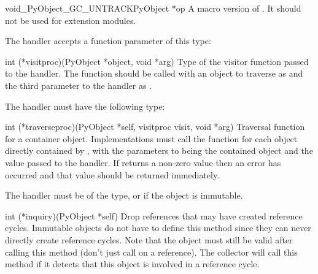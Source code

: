 \begin{cfuncdesc}{void}{_PyObject_GC_UNTRACK}{PyObject *op}
  A macro version of .  It should not be
  used for extension modules.
\end{cfuncdesc}

The  handler accepts a function parameter of this
type:

\begin{ctypedesc}[visitproc]{int (*visitproc)(PyObject *object, void *arg)}
  Type of the visitor function passed to the 
  handler.  The function should be called with an object to traverse
  as  and the third parameter to the 
  handler as .
\end{ctypedesc}

The  handler must have the following type:

\begin{ctypedesc}[traverseproc]{int (*traverseproc)(PyObject *self,
                                visitproc visit, void *arg)}
  Traversal function for a container object.  Implementations must
  call the  function for each object directly contained by
  , with the parameters to  being the contained
  object and the  value passed to the handler.  If
   returns a non-zero value then an error has occurred and
  that value should be returned immediately.
\end{ctypedesc}

The  handler must be of the  type, or
\NULL{} if the object is immutable.

\begin{ctypedesc}[inquiry]{int (*inquiry)(PyObject *self)}
  Drop references that may have created reference cycles.  Immutable
  objects do not have to define this method since they can never
  directly create reference cycles.  Note that the object must still
  be valid after calling this method (don't just call
   on a reference).  The collector will call
  this method if it detects that this object is involved in a
  reference cycle.
\end{ctypedesc}
